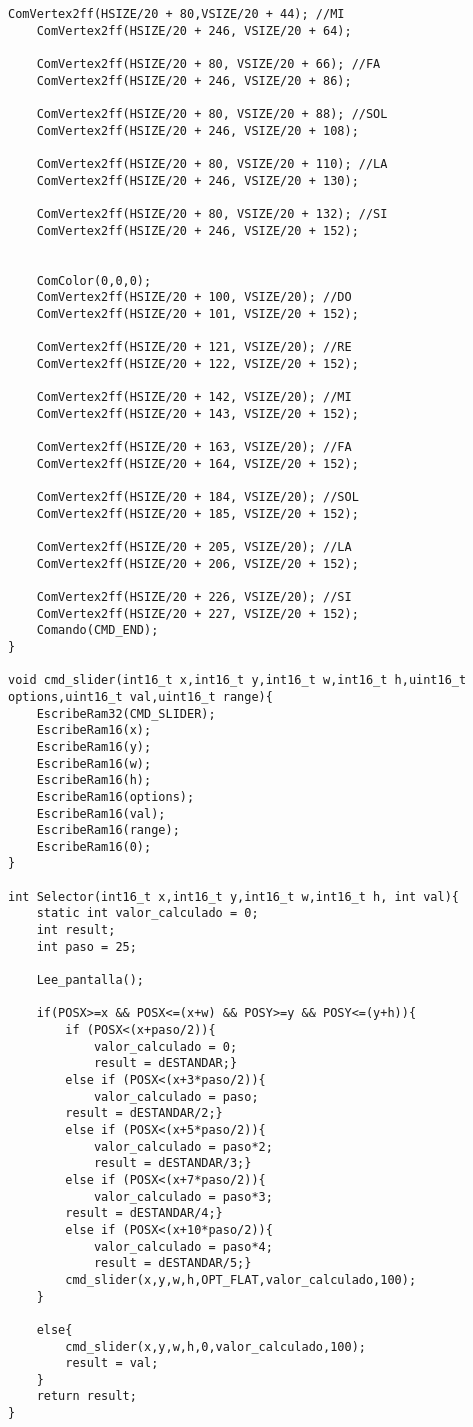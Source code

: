 \documentclass[12pt,a4paper]{article}
\begin{document}
\begin{lstlisting}[basicstyle=\footnotesize]
    ComVertex2ff(HSIZE/20 + 80,VSIZE/20 + 44); //MI
    ComVertex2ff(HSIZE/20 + 246, VSIZE/20 + 64);

    ComVertex2ff(HSIZE/20 + 80, VSIZE/20 + 66); //FA
    ComVertex2ff(HSIZE/20 + 246, VSIZE/20 + 86);

    ComVertex2ff(HSIZE/20 + 80, VSIZE/20 + 88); //SOL
    ComVertex2ff(HSIZE/20 + 246, VSIZE/20 + 108);

    ComVertex2ff(HSIZE/20 + 80, VSIZE/20 + 110); //LA
    ComVertex2ff(HSIZE/20 + 246, VSIZE/20 + 130);

    ComVertex2ff(HSIZE/20 + 80, VSIZE/20 + 132); //SI
    ComVertex2ff(HSIZE/20 + 246, VSIZE/20 + 152);


    ComColor(0,0,0);
    ComVertex2ff(HSIZE/20 + 100, VSIZE/20); //DO
    ComVertex2ff(HSIZE/20 + 101, VSIZE/20 + 152);

    ComVertex2ff(HSIZE/20 + 121, VSIZE/20); //RE
    ComVertex2ff(HSIZE/20 + 122, VSIZE/20 + 152);

    ComVertex2ff(HSIZE/20 + 142, VSIZE/20); //MI
    ComVertex2ff(HSIZE/20 + 143, VSIZE/20 + 152);

    ComVertex2ff(HSIZE/20 + 163, VSIZE/20); //FA
    ComVertex2ff(HSIZE/20 + 164, VSIZE/20 + 152);

    ComVertex2ff(HSIZE/20 + 184, VSIZE/20); //SOL
    ComVertex2ff(HSIZE/20 + 185, VSIZE/20 + 152);

    ComVertex2ff(HSIZE/20 + 205, VSIZE/20); //LA
    ComVertex2ff(HSIZE/20 + 206, VSIZE/20 + 152);

    ComVertex2ff(HSIZE/20 + 226, VSIZE/20); //SI
    ComVertex2ff(HSIZE/20 + 227, VSIZE/20 + 152);
    Comando(CMD_END);
}

void cmd_slider(int16_t x,int16_t y,int16_t w,int16_t h,uint16_t options,uint16_t val,uint16_t range){
    EscribeRam32(CMD_SLIDER);
    EscribeRam16(x);
    EscribeRam16(y);
    EscribeRam16(w);
    EscribeRam16(h);
    EscribeRam16(options);
    EscribeRam16(val);
    EscribeRam16(range);
    EscribeRam16(0);
}

int Selector(int16_t x,int16_t y,int16_t w,int16_t h, int val){
    static int valor_calculado = 0;
    int result;
    int paso = 25;

    Lee_pantalla();

    if(POSX>=x && POSX<=(x+w) && POSY>=y && POSY<=(y+h)){
        if (POSX<(x+paso/2)){
            valor_calculado = 0;
            result = dESTANDAR;}
        else if (POSX<(x+3*paso/2)){
            valor_calculado = paso;
        result = dESTANDAR/2;}
        else if (POSX<(x+5*paso/2)){
            valor_calculado = paso*2;
            result = dESTANDAR/3;}
        else if (POSX<(x+7*paso/2)){
            valor_calculado = paso*3;
        result = dESTANDAR/4;}
        else if (POSX<(x+10*paso/2)){
            valor_calculado = paso*4;
            result = dESTANDAR/5;}
        cmd_slider(x,y,w,h,OPT_FLAT,valor_calculado,100);
    }

    else{
        cmd_slider(x,y,w,h,0,valor_calculado,100);
        result = val;
    }
    return result;
}
\end{lstlisting}
\end{document}
